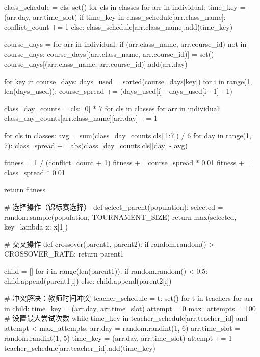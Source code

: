 \documentclass{ctexart}
\begin{document}
\begin{pythoncode}
	    class_schedule = {cls: set() for cls in classes}
	    for arr in individual:
	        time_key = (arr.day, arr.time_slot)
	        if time_key in class_schedule[arr.class_name]:
	            conflict_count += 1
	        else:
	            class_schedule[arr.class_name].add(time_key)
	
	    course_days = {}
	    for arr in individual:
	        if (arr.class_name, arr.course_id) not in course_days:
	            course_days[(arr.class_name, arr.course_id)] = set()
	        course_days[(arr.class_name, arr.course_id)].add(arr.day)
	
	    for key in course_days:
	        days_used = sorted(course_days[key])
	        for i in range(1, len(days_used)):
	            course_spread += (days_used[i] - days_used[i - 1] - 1)
	
	    class_day_counts = {cls: [0] * 7 for cls in classes}
	    for arr in individual:
	        class_day_counts[arr.class_name][arr.day] += 1
	
	    for cls in classes:
	        avg = sum(class_day_counts[cls][1:7]) / 6
	        for day in range(1, 7):
	            class_spread += abs(class_day_counts[cls][day] - avg)
	
	    fitness = 1 / (conflict_count + 1)
	    fitness += course_spread * 0.01
	    fitness += class_spread * 0.01
	
	    return fitness
	
	
	# 选择操作（锦标赛选择）
	def select_parent(population):
	    selected = random.sample(population, TOURNAMENT_SIZE)
	    return max(selected, key=lambda x: x[1])
	
	
	# 交叉操作
	def crossover(parent1, parent2):
	    if random.random() > CROSSOVER_RATE:
	        return parent1
	
	    child = []
	    for i in range(len(parent1)):
	        if random.random() < 0.5:
	            child.append(parent1[i])
	        else:
	            child.append(parent2[i])
	
	    # 冲突解决：教师时间冲突
	    teacher_schedule = {t: set() for t in teachers}
	    for arr in child:
	        time_key = (arr.day, arr.time_slot)
	        attempt = 0
	        max_attempts = 100  # 设置最大尝试次数
	        while time_key in teacher_schedule[arr.teacher_id] and attempt < max_attempts:
	            arr.day = random.randint(1, 6)
	            arr.time_slot = random.randint(1, 5)
	            time_key = (arr.day, arr.time_slot)
	            attempt += 1
	        teacher_schedule[arr.teacher_id].add(time_key)
	

\end{pythoncode}
\end{document}
